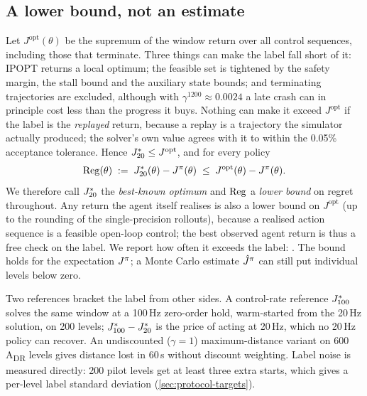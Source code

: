\subsection{A lower bound, not an estimate}
\label{sec:answer-lb}

Let $J^{\mathrm{opt}}(\theta)$ be the supremum of the window return over all control
sequences, including those that terminate. Three things can make the label fall short of
it: IPOPT returns a local optimum; the feasible set is tightened by the safety margin, the
stall bound and the auxiliary state bounds; and terminating trajectories are excluded,
although with
$\gamma^{1200} \approx 0.0024$ a late crash can in principle cost less than the progress it
buys.
Nothing can make it exceed $J^{\mathrm{opt}}$ if the label is the \emph{replayed} return,
because a replay is a trajectory the simulator actually produced; the solver's own value
agrees with it to within the 0.05\% acceptance tolerance.
Hence $J^{*}_{20} \le J^{\mathrm{opt}}$, and for every policy
\begin{equation}
  \mathrm{Reg}(\theta) \;:=\; J^{*}_{20}(\theta) - J^{\pi}(\theta) \;\le\;
  J^{\mathrm{opt}}(\theta) - J^{\pi}(\theta).
  \label{eq:lowerbound}
\end{equation}
We therefore call $J^{*}_{20}$ the \emph{best-known optimum} and $\mathrm{Reg}$ a \emph{lower bound}
on regret throughout. Any return the agent itself realises is also a lower bound on
$J^{\mathrm{opt}}$ (up to the rounding of the single-precision rollouts), because a
realised action sequence is a feasible open-loop control; the best observed agent return
is thus a free check on the label. We report how often it
exceeds the label: . The bound holds for the expectation $J^{\pi}$; a
Monte Carlo estimate $\hat{J}^{\pi}$ can still put individual levels below zero.

Two references bracket the label from other sides. A control-rate reference $J^{*}_{100}$
solves the same window at a 100\,Hz zero-order hold, warm-started from the 20\,Hz
solution, on 200 levels; $J^{*}_{100} - J^{*}_{20}$ is the price of acting at 20\,Hz, which no
20\,Hz policy can recover. An undiscounted ($\gamma = 1$) maximum-distance variant on 600
A\textsubscript{DR} levels gives distance lost in 60\,s without discount weighting.
Label noise is measured directly: 200 pilot levels get at least three extra starts, which
gives a per-level label standard deviation (\cref{sec:protocol-targets}).


